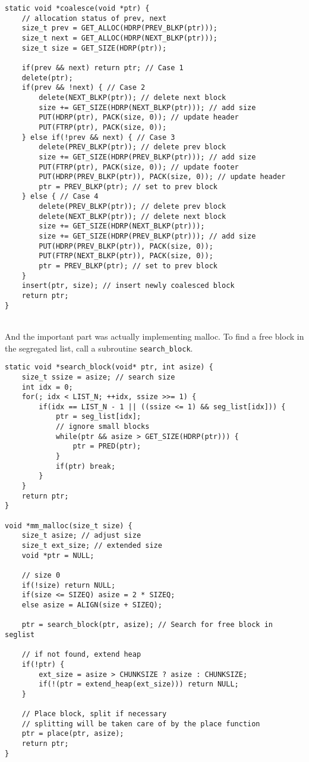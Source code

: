 \documentclass[12pt]{report}
\begin{document}
\begin{lstlisting}[style=Cstyle]
static void *coalesce(void *ptr) {
	// allocation status of prev, next
	size_t prev = GET_ALLOC(HDRP(PREV_BLKP(ptr)));
	size_t next = GET_ALLOC(HDRP(NEXT_BLKP(ptr)));
	size_t size = GET_SIZE(HDRP(ptr));
	
	if(prev && next) return ptr; // Case 1
	delete(ptr);
	if(prev && !next) { // Case 2
		delete(NEXT_BLKP(ptr)); // delete next block
		size += GET_SIZE(HDRP(NEXT_BLKP(ptr))); // add size
		PUT(HDRP(ptr), PACK(size, 0)); // update header
		PUT(FTRP(ptr), PACK(size, 0));
	} else if(!prev && next) { // Case 3
		delete(PREV_BLKP(ptr)); // delete prev block
		size += GET_SIZE(HDRP(PREV_BLKP(ptr))); // add size
		PUT(FTRP(ptr), PACK(size, 0)); // update footer
		PUT(HDRP(PREV_BLKP(ptr)), PACK(size, 0)); // update header
		ptr = PREV_BLKP(ptr); // set to prev block
	} else { // Case 4
		delete(PREV_BLKP(ptr)); // delete prev block
		delete(NEXT_BLKP(ptr)); // delete next block
		size += GET_SIZE(HDRP(NEXT_BLKP(ptr)));
		size += GET_SIZE(HDRP(PREV_BLKP(ptr))); // add size
		PUT(HDRP(PREV_BLKP(ptr)), PACK(size, 0));
		PUT(FTRP(NEXT_BLKP(ptr)), PACK(size, 0));
		ptr = PREV_BLKP(ptr); // set to prev block
	}
	insert(ptr, size); // insert newly coalesced block
	return ptr;
}
\end{lstlisting}~\\
And the important part was actually implementing malloc. To find a free block in the segregated list, call a subroutine \texttt{search\_block}.
\begin{lstlisting}[style=Cstyle]
static void *search_block(void* ptr, int asize) {
	size_t ssize = asize; // search size
	int idx = 0;
	for(; idx < LIST_N; ++idx, ssize >>= 1) {
		if(idx == LIST_N - 1 || ((ssize <= 1) && seg_list[idx])) {
			ptr = seg_list[idx];
			// ignore small blocks
            while(ptr && asize > GET_SIZE(HDRP(ptr))) {
				ptr = PRED(ptr);
			}
			if(ptr) break;
		}
	}
	return ptr;
}

void *mm_malloc(size_t size) {
	size_t asize; // adjust size
	size_t ext_size; // extended size
	void *ptr = NULL;
	
	// size 0
	if(!size) return NULL;
	if(size <= SIZEQ) asize = 2 * SIZEQ;
	else asize = ALIGN(size + SIZEQ);
	
	ptr = search_block(ptr, asize); // Search for free block in seglist
	
	// if not found, extend heap
	if(!ptr) {
		ext_size = asize > CHUNKSIZE ? asize : CHUNKSIZE;
		if(!(ptr = extend_heap(ext_size))) return NULL;
	}
	
	// Place block, split if necessary
	// splitting will be taken care of by the place function
	ptr = place(ptr, asize);
	return ptr;
}
\end{lstlisting}~\\
\end{document}
